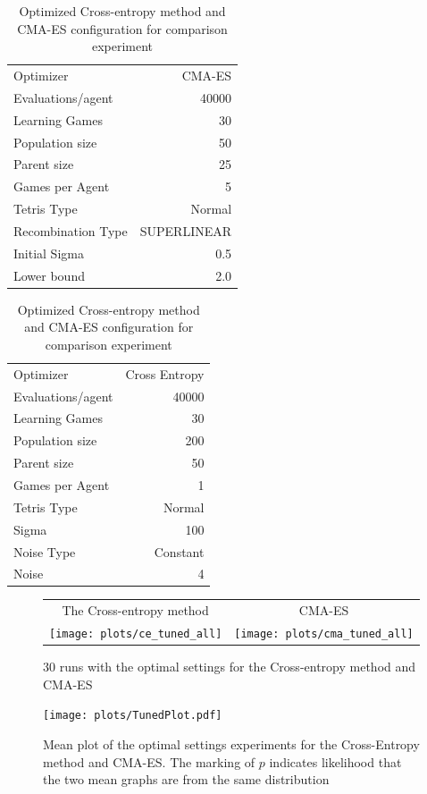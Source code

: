 \begin{table}[H]
\centering
\begin{tabular}{l r}
Optimizer & CMA-ES\\
Evaluations/agent & 40000\\
Learning Games & 30\\
Population size& 50\\
Parent size & 25\\
Games per Agent & 5\\
Tetris Type & Normal\\
\hline
Recombination Type & SUPERLINEAR\\
Initial Sigma & 0.5\\
Lower bound & 2.0\\
\end{tabular}
\quad
\begin{tabular}{l r}
Optimizer & Cross Entropy\\
Evaluations/agent & 40000\\
Learning Games & 30\\
Population size & 200\\
Parent size & 50\\
Games per Agent & 1\\
Tetris Type & Normal\\
\hline
Sigma & 100\\
Noise Type & Constant\\
Noise & 4
\end{tabular}
\caption{Optimized Cross-entropy method and CMA-ES configuration for comparison experiment}
\end{table}

\begin{figure}[H]
\begin{tabular}{@{}c@{}c@{}}
The Cross-entropy method & CMA-ES\\
\texttt{[image: plots/ce\_tuned\_all]} &
\texttt{[image: plots/cma\_tuned\_all]}
\end{tabular}
\caption{30 runs with the optimal settings for the Cross-entropy method and CMA-ES}
\end{figure}

\begin{figure}[H]
\centering
\texttt{[image: plots/TunedPlot.pdf]}
\caption{Mean plot of the optimal settings experiments for the Cross-Entropy method and CMA-ES. 
The marking of $p$ indicates likelihood that the two mean graphs are from the same 
distribution \label{fig:TunedMeanAppendix}}
\end{figure}


